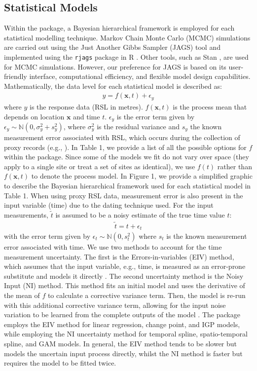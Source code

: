 \subsection{Statistical Models}\label{statisticalmodel}
Within the  package, a Bayesian hierarchical framework is employed for each statistical modelling technique. Markov Chain Monte Carlo (MCMC) simulations are carried out using the Just Another Gibbs Sampler (JAGS) tool \citep{plummer2003jags} and implemented using the \texttt{rjags} package in R \citep{plummer2016rjags}. Other tools, such as Stan \citep{carpenter2017stan}, are used for MCMC simulations. However, our preference for JAGS is based on its user-friendly interface, computational efficiency, and flexible model design capabilities.
Mathematically, the data level for each statistical model is described as:
\begin{align}
y = f(\mathbf{x},t) + \epsilon_y
\end{align}
where \(y\) is the response data (RSL in metres). \(f(\mathbf{x},t)\) is the process mean that depends on location \(\mathbf{x}\) and time \(t\). \(\epsilon_y\) is the error term given by \(\epsilon_y \sim \mathbb{N}(0, \sigma_y^2 + s_y^2)\), where \(\sigma_y^2\) is the residual variance and \(s_y\) the known measurement error associated with RSL, which occurs during the collection of proxy records (e.g., \citet{Kemp2015_SLhandbook}). In Table 1, we provide a list of all the possible options for \(f\) within the  package. Since some of the models we fit do not vary over space (they apply to a single site or treat a set of sites as identical), we use \(f(t)\) rather than \(f(\mathbf{x},t)\) to denote the process model. In Figure 1, we provide a simplified graphic to describe the Bayesian hierarchical framework used for each statistical model in Table 1.
When using proxy RSL data, measurement error is also present in the input variable (time) due to the dating technique used. For the input measurements, \(\tilde{t}\) is assumed to be a noisy estimate of the true time value \(t\):
\begin{align}
 \tilde{t} = t + \epsilon_t
\end{align}
with the error term given by \(\epsilon_t \sim \mathbb{N}(0, s_t^2)\) where \(s_t\) is the known measurement error associated with time.
We use two methods to account for the time measurement uncertainty. The first is the Errors-in-variables (EIV) method, which assumes that the input variable, e.g., time, is measured as an error-prone substitute and models it directly \citep{Dey2000}. The second uncertainty method is the Noisy Input (NI) method. This method fits an initial model and uses the derivative of the mean of \(f\) to calculate a corrective variance term. Then, the model is re-run with this additional corrective variance term, allowing for the input noise variation to be learned from the complete outputs of the model \citep{McHutchon2011}. The  package employs the EIV method for linear regression, change point, and IGP models, while employing the NI uncertainty method for temporal spline, spatio-temporal spline, and GAM models. In general, the EIV method tends to be slower but models the uncertain input process directly, whilst the NI method is faster but requires the model to be fitted twice.
